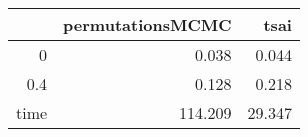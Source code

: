 \begin{table}[ht]
\centering
\begingroup\tiny
\begin{tabular}{rrr}
  \hline
 & permutationsMCMC & tsai \\ 
  \hline
0 & 0.038 & 0.044 \\ 
  0.4 & 0.128 & 0.218 \\ 
  time & 114.209 & 29.347 \\ 
   \hline
\end{tabular}
\endgroup
\end{table}
